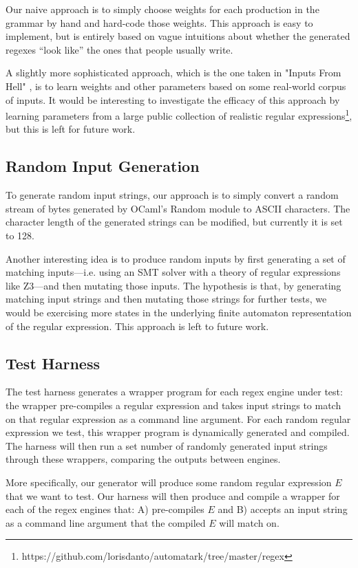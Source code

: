 \documentclass[acmsmall,nonacm,screen]{acmart}
\begin{document}
Our naive approach is to simply choose weights for each production in the grammar by hand and hard-code those weights. This approach is easy to implement, but is entirely based on vague intuitions about whether the generated regexes ``look like'' the ones that people usually write.

A slightly more sophisticated approach, which is the one taken in "Inputs From Hell" \cite{pavese2018inputs}, is to learn weights and other parameters based on some real-world corpus of inputs. It would be interesting to investigate the efficacy of this approach by learning parameters from a large public collection of realistic regular expressions\footnote{https://github.com/lorisdanto/automatark/tree/master/regex}, but this is left for future work.

\subsection{Random Input Generation}
To generate random input strings, our approach is to simply convert a random stream of bytes generated by OCaml's Random module to ASCII characters. The character length of the generated strings can be modified, but currently it is set to 128.

Another interesting idea is to produce random inputs by first generating a set of matching inputs—i.e. using an SMT solver with a theory of regular expressions like Z3—and then mutating those inputs. The hypothesis is that, by generating matching input strings and then mutating those strings for further tests, we would be exercising more states in the underlying finite automaton representation of the regular expression. This approach is left to future work.

\subsection{Test Harness}
The test harness generates a wrapper program for each regex engine under test: the wrapper pre-compiles a regular expression and takes input strings to match on that regular expression as a command line argument. For each random regular expression we test, this wrapper program is dynamically generated and compiled. The harness will then run a set number of randomly generated input strings through these wrappers, comparing the outputs between engines.

More specifically, our generator will produce some random regular expression $E$ that we want to test. Our harness will then produce and compile a wrapper for each of the regex engines that: A) pre-compiles $E$ and B) accepts an input string as a command line argument that the compiled $E$ will match on.
\end{document}

